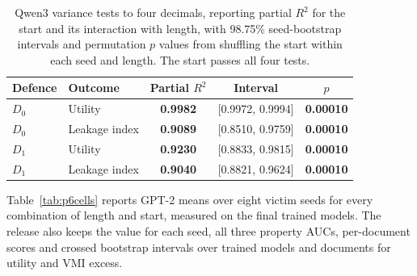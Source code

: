 \documentclass[11pt]{article}
\newcommand{\keyresult}[1]{\textbf{\textcolor{resultcol}{#1}}}
\newcommand{\passresult}[1]{\textbf{\textcolor{passcol}{#1}}}
\begin{document}
\begin{table}[H]
\centering\small
\begin{tabular}{llccc}
\toprule
Defence & Outcome & Partial $R^2$ & Interval & $p$ \\
\midrule
$D_0$ & Utility & \keyresult{0.9982} & [0.9972, 0.9994] & \passresult{0.00010} \\
$D_0$ & Leakage index & \keyresult{0.9089} & [0.8510, 0.9759] & \passresult{0.00010} \\
$D_1$ & Utility & \keyresult{0.9230} & [0.8833, 0.9815] & \passresult{0.00010} \\
$D_1$ & Leakage index & \keyresult{0.9040} & [0.8821, 0.9624] & \passresult{0.00010} \\
\bottomrule
\end{tabular}
\caption{Qwen3 variance tests to four decimals, reporting partial $R^2$ for the start and its interaction with length, with 98.75\% seed-bootstrap intervals and permutation $p$ values from shuffling the start within each seed and length. The start passes all four tests.}
\label{tab:qwen}
\end{table}

Table~\ref{tab:p6cells} reports GPT-2 means over eight victim seeds for every combination of length and start, measured on the final trained models. The release also keeps the value for each seed, all three property AUCs, per-document scores and crossed bootstrap intervals over trained models and documents for utility and VMI excess.
\end{document}
